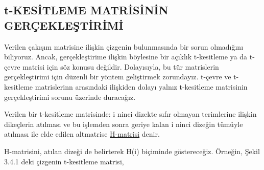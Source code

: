 \documentclass[11pt]{amsbook}
\begin{document}

\subsection{t-KESİTLEME MATRİSİNİN GERÇEKLEŞTİRİMİ}

Verilen çakışım matrisine ilişkin çizgenin bulunmasında bir sorun olmadığını biliyoruz. Ancak, gerçekleştirime ilişkin böylesine bir açıklık t-kesitleme ya da t-çevre matrisi için söz konusu değildir. Dolayısıyla, bu tür matrislerin gerçekleştirimi için düzenli bir yöntem geliştirmek zorundayız. t-çevre ve t-kesitleme matrislerinn arasındaki ilişkiden dolayı yalnız t-kesitleme matrisinin gerçekleştirimi sorunu üzerinde duracağız.
\begin{definition}
Verilen bir t-kesitleme matrisinde: i ninci dizekte sıfır olmayan terimlerine ilişkin dikeçlerin atılması ve bu işlemden sonra geriye kalan i ninci dizeğin tümüyle atılması ile elde edilen altmatrise \underline{H-matrisi} denir.
\end{definition}
H-matrisini, atılan dizeği de belirterek H(i) biçiminde göstereceğiz. Örneğin, Şekil 3.4.1 deki çizgenin t-kesitleme matrisi,
\end{document}
